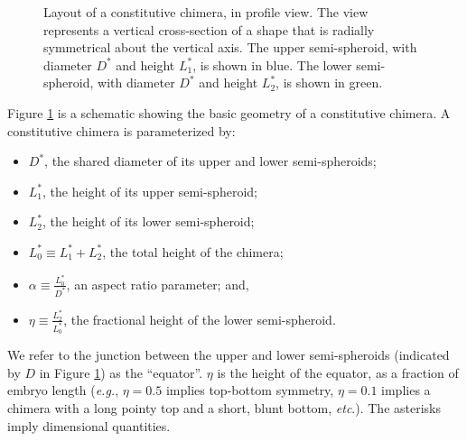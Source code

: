 \documentclass[10pt,a4paper]{article}
\def\etc{\emph{etc}.\xspace}
\begin{document}
\begin{figure}[t] 
	\begin{center}
	\end{center}
	\caption{Layout of a constitutive chimera, in profile view. The view represents a vertical cross-section of a shape that is radially symmetrical about the vertical axis. The upper semi-spheroid, with diameter $D^*$ and height $L_1^*$, is shown in blue. The lower semi-spheroid, with diameter $D^*$ and height $L^*_2$, is shown in green. } \label{fig:chimera1}
\end{figure}
\noindent
Figure \ref{fig:chimera1} is a schematic showing the basic geometry of a constitutive chimera.
A constitutive chimera is parameterized by:
\begin{itemize}
	\item $D^*$, the shared diameter of its upper and lower semi-spheroids;
	\item $L_1^*$, the height of its upper semi-spheroid;
	\item $L_2^*$, the height of its  lower semi-spheroid; 
	\item $L_0^* \equiv L_1^* + L_2^*$, the total height of the chimera;
	\item $\alpha \equiv \frac{L_0^*}{D^*}$, an aspect ratio parameter; and,
	\item $\eta \equiv \frac{L_2^*}{L_0^*}$, the fractional height of the lower semi-spheroid.
\end{itemize}
We refer to the junction between the upper and lower semi-spheroids (indicated by $D$ in Figure \ref{fig:chimera1}) as the ``equator''.
$\eta$ is the height of the equator, as a fraction of embryo length (\textit{e.g.}, $\eta = 0.5$ implies top-bottom symmetry, $\eta = 0.1$ implies a chimera with a long pointy top and a short, blunt bottom, \etc).
The asterisks imply dimensional quantities.
\end{document}
